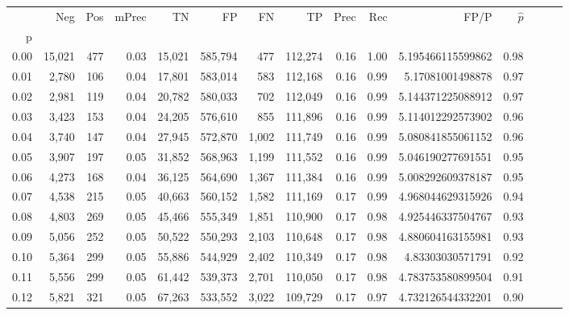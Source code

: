 \begin{tabular}{rrrrrrrrrrrrrrr}
\toprule
{} &     Neg &    Pos & mPrec &       TN &       FP &       FN &       TP &  Prec &   Rec &                  FP/P & $\hat{p}$ \\
p    &         &        &       &          &          &          &          &       &       &                       &           \\
\midrule
0.00 &  15,021 &    477 &  0.03 &   15,021 &  585,794 &      477 &  112,274 &  0.16 &  1.00 &     5.195466115599862 &      0.98 \\
0.01 &   2,780 &    106 &  0.04 &   17,801 &  583,014 &      583 &  112,168 &  0.16 &  0.99 &      5.17081001498878 &      0.97 \\
0.02 &   2,981 &    119 &  0.04 &   20,782 &  580,033 &      702 &  112,049 &  0.16 &  0.99 &     5.144371225088912 &      0.97 \\
0.03 &   3,423 &    153 &  0.04 &   24,205 &  576,610 &      855 &  111,896 &  0.16 &  0.99 &     5.114012292573902 &      0.96 \\
0.04 &   3,740 &    147 &  0.04 &   27,945 &  572,870 &    1,002 &  111,749 &  0.16 &  0.99 &     5.080841855061152 &      0.96 \\
0.05 &   3,907 &    197 &  0.05 &   31,852 &  568,963 &    1,199 &  111,552 &  0.16 &  0.99 &     5.046190277691551 &      0.95 \\
0.06 &   4,273 &    168 &  0.04 &   36,125 &  564,690 &    1,367 &  111,384 &  0.16 &  0.99 &     5.008292609378187 &      0.95 \\
0.07 &   4,538 &    215 &  0.05 &   40,663 &  560,152 &    1,582 &  111,169 &  0.17 &  0.99 &     4.968044629315926 &      0.94 \\
0.08 &   4,803 &    269 &  0.05 &   45,466 &  555,349 &    1,851 &  110,900 &  0.17 &  0.98 &     4.925446337504767 &      0.93 \\
0.09 &   5,056 &    252 &  0.05 &   50,522 &  550,293 &    2,103 &  110,648 &  0.17 &  0.98 &     4.880604163155981 &      0.93 \\
0.10 &   5,364 &    299 &  0.05 &   55,886 &  544,929 &    2,402 &  110,349 &  0.17 &  0.98 &      4.83303030571791 &      0.92 \\
0.11 &   5,556 &    299 &  0.05 &   61,442 &  539,373 &    2,701 &  110,050 &  0.17 &  0.98 &     4.783753580899504 &      0.91 \\
0.12 &   5,821 &    321 &  0.05 &   67,263 &  533,552 &    3,022 &  109,729 &  0.17 &  0.97 &     4.732126544332201 &      0.90 \\

\end{tabular}
